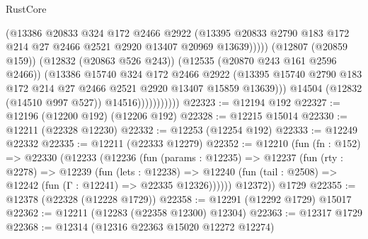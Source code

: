 \begin{lexlean}{RustCore}
\begin{coremodule}
                                  (@13386
                                    @20833
                                    @324
                                    @172
                                    @2466
                                    @2922
                                    (@13395
                                      @20833
                                      @2790
                                      @183
                                      @172
                                      @214
                                      @27
                                      @2466
                                      @2521
                                      @2920
                                      @13407
                                      @20969
                                      @13639)))))
                            (@12807 (@20859 @159))
                            (@12832 (@20863 @526 @243))
                            (@12535 (@20870 @243 @161 @2596 @2466))
                            (@13386
                              @15740
                              @324
                              @172
                              @2466
                              @2922
                              (@13395
                                @15740
                                @2790
                                @183
                                @172
                                @214
                                @27
                                @2466
                                @2521
                                @2920
                                @13407
                                @15859
                                @13639)))
                          @14504
                          (@12832 (@14510 @997 @527))
                          @14516)))))))))))
@22323 := @12194 @192
@22327 := @12196 (@12200 @192) (@12206 @192)
@22328 := @12215 @15014
@22330 := @12211 (@22328 @12230)
@22332 := @12253 (@12254 @192)
@22333 := @12249 @22332
@22335 := @12211 (@22333 @12279)
@22352 := @12210
    (fun (fn : @152) =>
    @22330
      (@12233
        (@12236
          (fun (params : @12235) =>
          @12237
            (fun (rty : @2278) =>
            @12239
              (fun (lets : @12238) =>
              @12240 (fun (tail : @2508) => @12242 (fun (Γ : @12241) => @22335 @12326))))))
        @12372))
    @1729
@22355 := @12378 (@22328 (@12228 @1729))
@22358 := @12291 (@12292 @1729) @15017
@22362 := @12211 (@12283 (@22358 @12300) @12304)
@22363 := @12317 @1729
@22368 := @12314 (@12316 @22363 @15020 @12272 @12274)

\end{coremodule}
\end{lexlean}
